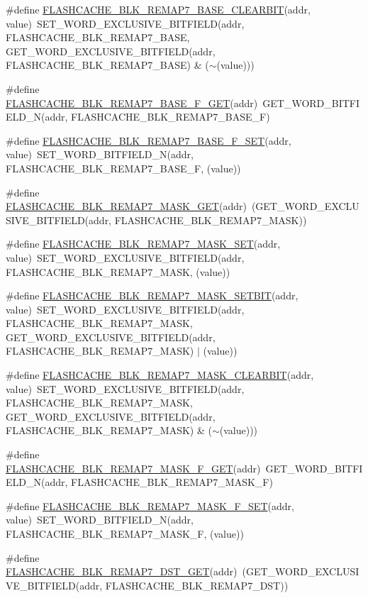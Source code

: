 \begin{DoxyCompactItemize}
\item 
\#define \hyperlink{a00549_af39ccf7b6250fa07e60949d1abc9eab2}{FLASHCACHE\_\-BLK\_\-REMAP7\_\-BASE\_\-CLEARBIT}(addr, value)~SET\_\-WORD\_\-EXCLUSIVE\_\-BITFIELD(addr, FLASHCACHE\_\-BLK\_\-REMAP7\_\-BASE, GET\_\-WORD\_\-EXCLUSIVE\_\-BITFIELD(addr, FLASHCACHE\_\-BLK\_\-REMAP7\_\-BASE) \& ($\sim$(value)))
\item 
\#define \hyperlink{a00549_ad4e37e4130eece83e9659dff1e896873}{FLASHCACHE\_\-BLK\_\-REMAP7\_\-BASE\_\-F\_\-GET}(addr)~GET\_\-WORD\_\-BITFIELD\_\-N(addr, FLASHCACHE\_\-BLK\_\-REMAP7\_\-BASE\_\-F)
\item 
\#define \hyperlink{a00549_a28a0e70d1b090e9cb26d3182013ff5e3}{FLASHCACHE\_\-BLK\_\-REMAP7\_\-BASE\_\-F\_\-SET}(addr, value)~SET\_\-WORD\_\-BITFIELD\_\-N(addr, FLASHCACHE\_\-BLK\_\-REMAP7\_\-BASE\_\-F, (value))
\item 
\#define \hyperlink{a00549_ae88ea7ac827daa52ba5883e875365ed4}{FLASHCACHE\_\-BLK\_\-REMAP7\_\-MASK\_\-GET}(addr)~(GET\_\-WORD\_\-EXCLUSIVE\_\-BITFIELD(addr, FLASHCACHE\_\-BLK\_\-REMAP7\_\-MASK))
\item 
\#define \hyperlink{a00549_a7db20cb67a83caf84be5aec028e8f5e5}{FLASHCACHE\_\-BLK\_\-REMAP7\_\-MASK\_\-SET}(addr, value)~SET\_\-WORD\_\-EXCLUSIVE\_\-BITFIELD(addr, FLASHCACHE\_\-BLK\_\-REMAP7\_\-MASK, (value))
\item 
\#define \hyperlink{a00549_a83c68964392911900af2d502895871e2}{FLASHCACHE\_\-BLK\_\-REMAP7\_\-MASK\_\-SETBIT}(addr, value)~SET\_\-WORD\_\-EXCLUSIVE\_\-BITFIELD(addr, FLASHCACHE\_\-BLK\_\-REMAP7\_\-MASK, GET\_\-WORD\_\-EXCLUSIVE\_\-BITFIELD(addr, FLASHCACHE\_\-BLK\_\-REMAP7\_\-MASK) $|$ (value))
\item 
\#define \hyperlink{a00549_a2efcf9e8e651dcc060db74ecbde4f76d}{FLASHCACHE\_\-BLK\_\-REMAP7\_\-MASK\_\-CLEARBIT}(addr, value)~SET\_\-WORD\_\-EXCLUSIVE\_\-BITFIELD(addr, FLASHCACHE\_\-BLK\_\-REMAP7\_\-MASK, GET\_\-WORD\_\-EXCLUSIVE\_\-BITFIELD(addr, FLASHCACHE\_\-BLK\_\-REMAP7\_\-MASK) \& ($\sim$(value)))
\item 
\#define \hyperlink{a00549_a3f63a5e38f3d1e071e99e7899030ccfa}{FLASHCACHE\_\-BLK\_\-REMAP7\_\-MASK\_\-F\_\-GET}(addr)~GET\_\-WORD\_\-BITFIELD\_\-N(addr, FLASHCACHE\_\-BLK\_\-REMAP7\_\-MASK\_\-F)
\item 
\#define \hyperlink{a00549_af58e108447a29a11229cbc8cbf5bdbdc}{FLASHCACHE\_\-BLK\_\-REMAP7\_\-MASK\_\-F\_\-SET}(addr, value)~SET\_\-WORD\_\-BITFIELD\_\-N(addr, FLASHCACHE\_\-BLK\_\-REMAP7\_\-MASK\_\-F, (value))
\item 
\#define \hyperlink{a00549_a106184a0f4ce6ea30b5f0527cdeaa545}{FLASHCACHE\_\-BLK\_\-REMAP7\_\-DST\_\-GET}(addr)~(GET\_\-WORD\_\-EXCLUSIVE\_\-BITFIELD(addr, FLASHCACHE\_\-BLK\_\-REMAP7\_\-DST))

\end{DoxyCompactItemize}
